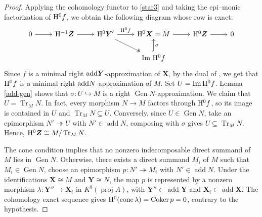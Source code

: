 \documentclass[reqno,12pt]{amsart}
\numberwithin{equation}{section}
\theoremstyle{plain}
\theoremstyle{definition}
\begin{document}
\begin{proof}
Applying the cohomology functor to \eqref{star3} and taking the epi--monic factorization of
${\rm H}^{0}f$, we obtain the following diagram whose row is exact:
\[\begin{tikzcd}
	0 & {{\rm H}^{-1}\boldsymbol{Z}} & {{\rm H}^{0}\boldsymbol{Y}'} & {{\rm H}^{0}\boldsymbol{X}=M} & {{\rm H}^{0}\boldsymbol{Z}} & 0 \\
	&&& {\im\,{\rm H}^{0}f}
	\arrow[from=1-1, to=1-2]
	\arrow[from=1-2, to=1-3]
	\arrow["{{\rm H}^{0}f}", from=1-3, to=1-4]
	\arrow[""', two heads, from=1-3, to=2-4]
	\arrow[from=1-4, to=1-5]
	\arrow[from=1-5, to=1-6]
	\arrow["{\sigma}"', hook, from=2-4, to=1-4]
\end{tikzcd}\]
Since $f$ is a minimal right ${\rm add}\boldsymbol{Y}$-approximation of
$\boldsymbol{X}$, by the dual of \cite[Lemma 6.9]{MAR}, we get that ${\rm H}^{0}f$
is a minimal right ${\rm add}N$-approximation of $M$. Set
$U=\operatorname{Im}{\rm H}^{0}f$. Lemma \ref{add-gen} shows that
$\sigma:U\hookrightarrow M$ is a right
$\operatorname{Gen}N$-approximation. We claim that
$U=\operatorname{Tr}_MN$. In fact, every morphism $N\to M$ factors through ${\rm H}^{0}f$, so its image is
contained in $U$ and $\operatorname{Tr}_MN\subseteq U$. Conversely, since
$U\in\operatorname{Gen}N$, take an epimorphism $N'\twoheadrightarrow U$ with
$N'\in\operatorname{add}N$, composing with $\sigma$ gives
$U\subseteq\operatorname{Tr}_MN$. Hence,
${\rm H}^{0}\boldsymbol{Z}\cong M/\operatorname{Tr}_MN$.

The cone condition implies that no nonzero indecomposable direct summand of
$M$ lies in $\operatorname{Gen}N$. Otherwise, there exists a direct summand $M_i$ of $ M$ such that
$M_i\in\operatorname{Gen}N$, choose an epimorphism $p:N'\twoheadrightarrow M_i$
with $N'\in\operatorname{add}N$. Under the identifications
$\boldsymbol{X}\cong M$ and $\boldsymbol{Y}\cong N$, the map $p$ is
represented by a nonzero morphism
$\lambda:\boldsymbol{Y}''\to\boldsymbol{X}_i$ in
$K^b(\operatorname{proj}A)$, with
$\boldsymbol{Y}''\in\operatorname{add}\boldsymbol{Y}$ and
$\boldsymbol{X}_i\in\operatorname{add}\boldsymbol{X}$. The cohomology exact
sequence gives ${\rm H}^{0}(\operatorname{cone}\lambda)=\operatorname{Coker}p=0$,
contrary to the hypothesis.


\end{proof}
\end{document}
